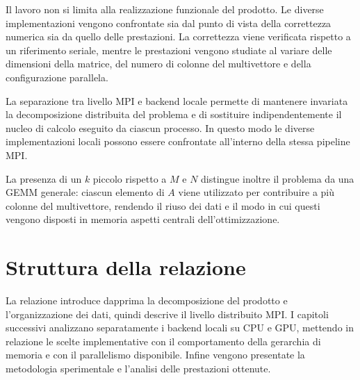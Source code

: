 Il lavoro non si limita alla realizzazione funzionale del prodotto.
Le diverse implementazioni vengono confrontate sia dal punto di vista
della correttezza numerica sia da quello delle prestazioni. La correttezza
viene verificata rispetto a un riferimento seriale, mentre le prestazioni
vengono studiate al variare delle dimensioni della matrice, del numero di
colonne del multivettore e della configurazione parallela.

La separazione tra livello MPI e backend locale permette di mantenere
invariata la decomposizione distribuita del problema e di sostituire
indipendentemente il nucleo di calcolo eseguito da ciascun processo.
In questo modo le diverse implementazioni locali possono essere confrontate
all'interno della stessa pipeline MPI.

La presenza di un $k$ piccolo rispetto a $M$ e $N$ distingue inoltre il
problema da una GEMM generale: ciascun elemento di $A$ viene utilizzato
per contribuire a più colonne del multivettore, rendendo il riuso dei dati
e il modo in cui questi vengono disposti in memoria aspetti centrali
dell'ottimizzazione.

\section{Struttura della relazione}

La relazione introduce dapprima la decomposizione del prodotto e
l'organizzazione dei dati, quindi descrive il livello distribuito MPI.
I capitoli successivi analizzano separatamente i backend locali su CPU e
GPU, mettendo in relazione le scelte implementative con il comportamento
della gerarchia di memoria e con il parallelismo disponibile.
Infine vengono presentate la metodologia sperimentale e l'analisi delle
prestazioni ottenute.